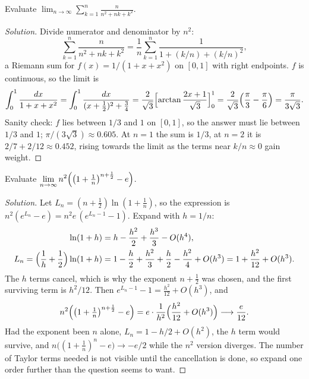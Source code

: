 \begin{example}
Evaluate $\displaystyle\lim_{n\to\infty}\sum_{k=1}^{n}\frac{n}{n^2+nk+k^2}$.
\end{example}

\begin{proof}[Solution]
Divide numerator and denominator by $n^2$:
\[
\sum_{k=1}^n\frac{n}{n^2+nk+k^2}=\frac1n\sum_{k=1}^n\frac{1}{1+(k/n)+(k/n)^2},
\]
a Riemann sum for $f(x)=1/(1+x+x^2)$ on $[0,1]$ with right endpoints. $f$ is continuous, so the limit is
\[
\int_0^1\frac{dx}{1+x+x^2}=\int_0^1\frac{dx}{(x+\frac12)^2+\frac34}=\frac{2}{\sqrt3}\Bigl[\arctan\frac{2x+1}{\sqrt3}\Bigr]_0^1=\frac{2}{\sqrt3}\Bigl(\frac\pi3-\frac\pi6\Bigr)=\frac{\pi}{3\sqrt3}.
\]
Sanity check: $f$ lies between $1/3$ and $1$ on $[0,1]$, so the answer must lie between $1/3$ and $1$; $\pi/(3\sqrt3)\approx 0.605$. At $n=1$ the sum is $1/3$, at $n=2$ it is $2/7+2/12\approx 0.452$, rising towards the limit as the terms near $k/n\approx 0$ gain weight.
\end{proof}

\begin{example}
Evaluate $\displaystyle\lim_{n\to\infty}n^2\Bigl(\bigl(1+\tfrac1n\bigr)^{n+\frac12}-e\Bigr)$.
\end{example}

\begin{proof}[Solution]
Let $L_n=(n+\tfrac12)\ln(1+\tfrac1n)$, so the expression is $n^2(e^{L_n}-e)=n^2e\,(e^{L_n-1}-1)$. Expand with $h=1/n$:
\begin{align*}
\ln(1+h)&=h-\frac{h^2}{2}+\frac{h^3}{3}-O(h^4),\\
L_n=\Bigl(\frac1h+\frac12\Bigr)\ln(1+h)&=1-\frac h2+\frac{h^2}{3}+\frac h2-\frac{h^2}{4}+O(h^3)=1+\frac{h^2}{12}+O(h^3).
\end{align*}
The $h$ terms cancel, which is why the exponent $n+\tfrac12$ was chosen, and the first surviving term is $h^2/12$. Then $e^{L_n-1}-1=\frac{h^2}{12}+O(h^3)$, and
\[
n^2\Bigl(\bigl(1+\tfrac1n\bigr)^{n+\frac12}-e\Bigr)=e\cdot\frac{1}{h^2}\Bigl(\frac{h^2}{12}+O(h^3)\Bigr)\longrightarrow\frac{e}{12}.
\]
Had the exponent been $n$ alone, $L_n=1-h/2+O(h^2)$, the $h$ term would survive, and $n\bigl((1+\frac1n)^n-e\bigr)\to-e/2$ while the $n^2$ version diverges. The number of Taylor terms needed is not visible until the cancellation is done, so expand one order further than the question seems to want.
\end{proof}

